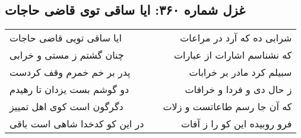 \begin{center}
\section*{غزل شماره ۳۶۰: ایا ساقی توی قاضی حاجات}
\label{sec:0360}
\begin{longtable}{l p{0.5cm} r}
ایا ساقی تویی قاضی حاجات
&&
شرابی ده که آرد در مراعات
\\
چنان گشتم ز مستی و خرابی
&&
که نشناسم اشارات از عبارات
\\
پدر بر خم خمرم وقف کردست
&&
سبیلم کرد مادر بر خرابات
\\
دو گوشم بست یزدان تا رهیدم
&&
ز حال دی و فردا و خرافات
\\
دگرگون است کوی اهل تمییز
&&
که آن جا رسم طاعاتست و زلات
\\
در این کو کدخدا شاهی است باقی
&&
فرو روبیده این کو را ز آفات
\\
\end{longtable}
\end{center}
